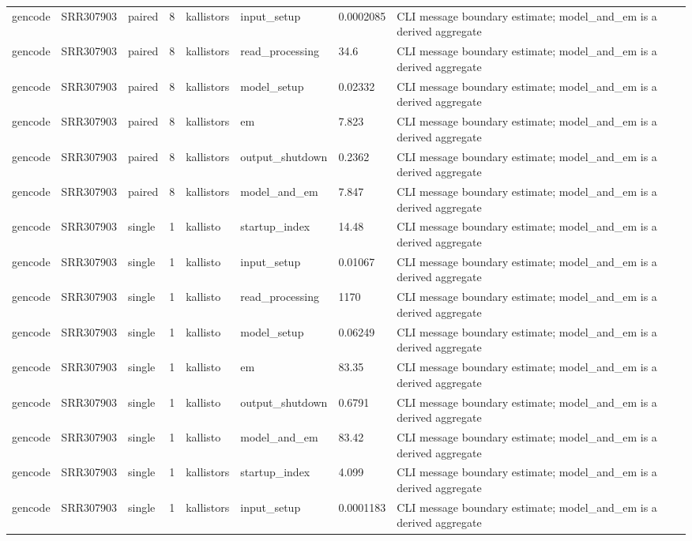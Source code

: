\begin{tabular}{llllllll}
gencode & SRR307903 & paired & 8 & kallistors & input\_setup & 0.0002085 & CLI message boundary estimate; model\_and\_em is a derived aggregate \\
gencode & SRR307903 & paired & 8 & kallistors & read\_processing & 34.6 & CLI message boundary estimate; model\_and\_em is a derived aggregate \\
gencode & SRR307903 & paired & 8 & kallistors & model\_setup & 0.02332 & CLI message boundary estimate; model\_and\_em is a derived aggregate \\
gencode & SRR307903 & paired & 8 & kallistors & em & 7.823 & CLI message boundary estimate; model\_and\_em is a derived aggregate \\
gencode & SRR307903 & paired & 8 & kallistors & output\_shutdown & 0.2362 & CLI message boundary estimate; model\_and\_em is a derived aggregate \\
gencode & SRR307903 & paired & 8 & kallistors & model\_and\_em & 7.847 & CLI message boundary estimate; model\_and\_em is a derived aggregate \\
gencode & SRR307903 & single & 1 & kallisto & startup\_index & 14.48 & CLI message boundary estimate; model\_and\_em is a derived aggregate \\
gencode & SRR307903 & single & 1 & kallisto & input\_setup & 0.01067 & CLI message boundary estimate; model\_and\_em is a derived aggregate \\
gencode & SRR307903 & single & 1 & kallisto & read\_processing & 1170 & CLI message boundary estimate; model\_and\_em is a derived aggregate \\
gencode & SRR307903 & single & 1 & kallisto & model\_setup & 0.06249 & CLI message boundary estimate; model\_and\_em is a derived aggregate \\
gencode & SRR307903 & single & 1 & kallisto & em & 83.35 & CLI message boundary estimate; model\_and\_em is a derived aggregate \\
gencode & SRR307903 & single & 1 & kallisto & output\_shutdown & 0.6791 & CLI message boundary estimate; model\_and\_em is a derived aggregate \\
gencode & SRR307903 & single & 1 & kallisto & model\_and\_em & 83.42 & CLI message boundary estimate; model\_and\_em is a derived aggregate \\
gencode & SRR307903 & single & 1 & kallistors & startup\_index & 4.099 & CLI message boundary estimate; model\_and\_em is a derived aggregate \\
gencode & SRR307903 & single & 1 & kallistors & input\_setup & 0.0001183 & CLI message boundary estimate; model\_and\_em is a derived aggregate \\

\end{tabular}
